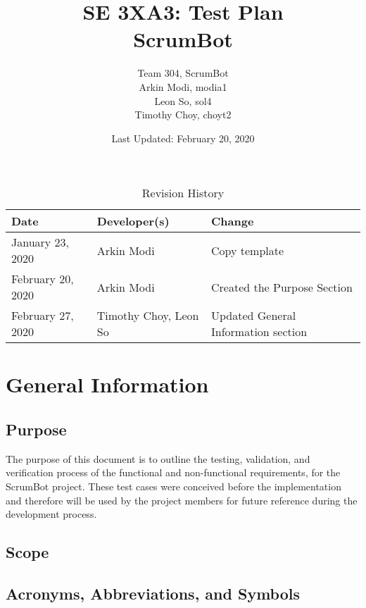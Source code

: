 \documentclass[12pt, titlepage]{article}
\title{SE 3XA3: Test Plan\\ScrumBot}
\author{
    Team 304, ScrumBot
        \\ Arkin Modi, modia1
        \\ Leon So, sol4
        \\ Timothy Choy, choyt2
}
\date{Last Updated: February 20, 2020}
\begin{document}
\newpage
\maketitle

\tableofcontents
\listoftables
\listoffigures

\newpage

\begin{table}[!h]
    \caption{Revision History} \label{TblRevisionHistory}
    \begin{tabularx}{\textwidth}{llX}
        \toprule
            \textbf{Date} & \textbf{Developer(s)} & \textbf{Change}\\
        \midrule
            January 23, 2020 & Arkin Modi & Copy template\\
            February 20, 2020 & Arkin Modi & Created the Purpose Section\\
            February 27, 2020 & Timothy Choy, Leon So & Updated General Information section\\
        \bottomrule
    \end{tabularx}
\end{table}


\newpage


\section{General Information}

\subsection{Purpose}
The purpose of this document is to outline the testing, validation, and verification process of the functional and non-functional requirements, for the ScrumBot project. These test cases were conceived before the implementation and therefore will be used by the project members for future reference during the development process.

\subsection{Scope}

\subsection{Acronyms, Abbreviations, and Symbols}
    
\end{document}
